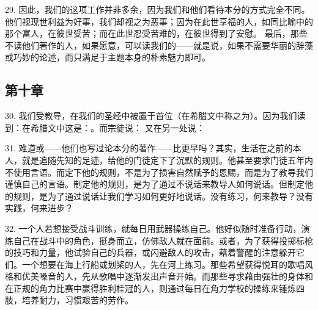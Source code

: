 29. 因此，我们的这项工作并非多余，因为我们和他们看待本分的方式完全不同。他们视现世利益为好事，我们却视之为恶事；因为在此世享福的人，如同比喻中的那个富人，在彼世受苦；而在此世忍受苦难的，在彼世得到了安慰。 最后，那些不读他们著作的人，如果愿意，可以读我们的——就是说，如果不需要华丽的辞藻或巧妙的论述，而只满足于主题本身的朴素魅力即可。\par


\subsection{第十章}

\par

30. 我们受教导，在我们的圣经中被置于首位（在希腊文中称之为）。因为我们读到：在希腊文中这是：。而宗徒说： 又在另一处说：\par

31. 难道或——他们也写过论本分的著作——比更早吗？其实，生活在之前的本人，就是追随先知的足迹，给他的门徒定下了沉默的规则。他甚至要求门徒五年内不使用言语。而定下他的规则，不是为了损害自然赋予的恩赐，而是为了教导我们谨慎自己的言语。制定他的规则，是为了通过不说话来教导人如何说话。但制定他的规则，是为了通过说话让我们学习如何更好地说话。没有练习，何来教导？没有实践，何来进步？\par

32. 一个人若想接受战斗训练，就每日用武器操练自己。他好似随时准备行动，演练自己在战斗中的角色，挺身而立，仿佛敌人就在面前。或者，为了获得投掷标枪的技巧和力量，他试验自己的兵器，或闪避敌人的攻击，藉着警醒的注意躲开它们。一个想要在海上行船或划桨的人，先在河上练习。那些希望获得悦耳的歌唱风格和优美嗓音的人，先从歌唱中逐渐发出声音开始。而那些寻求藉由强壮的身体和在正规的角力比赛中赢得胜利桂冠的人，则通过每日在角力学校的操练来锤炼四肢，培养耐力，习惯艰苦的劳作。\par

